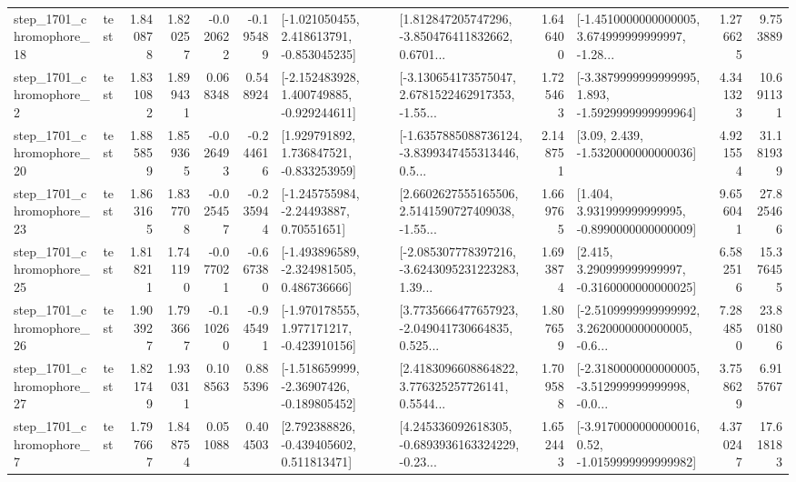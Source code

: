 \begin{tabular}{llrrrrllrlrr}
 step\_1701\_chromophore\_18 &      test &      1.840878 &    1.820257 &     -0.020622 & -0.195489 &   [-1.021050455, 2.418613791, -0.853045235] &  [1.812847205747296, -3.850476411832662, 0.6701... &       1.646400 &  [-1.4510000000000005, 3.674999999999997, -1.28... &            1.276625 &          9.753889 \\
  step\_1701\_chromophore\_2 &      test &      1.831082 &    1.899431 &      0.068348 &  0.548924 &   [-2.152483928, 1.400749885, -0.929244611] &  [-3.130654173575047, 2.6781522462917353, -1.55... &       1.725463 &  [-3.3879999999999995, 1.893, -1.5929999999999964] &            4.341323 &         10.691131 \\
 step\_1701\_chromophore\_20 &      test &      1.885859 &    1.859365 &     -0.026493 & -0.244616 &    [1.929791892, 1.736847521, -0.833253959] &  [-1.6357885088736124, -3.8399347455313446, 0.5... &       2.148751 &                 [3.09, 2.439, -1.5320000000000036] &            4.921554 &         31.181939 \\
 step\_1701\_chromophore\_23 &      test &      1.863165 &    1.837708 &     -0.025457 & -0.235944 &     [-1.245755984, -2.24493887, 0.70551651] &  [2.6602627555165506, 2.5141590727409038, -1.55... &       1.669765 &    [1.404, 3.931999999999995, -0.8990000000000009] &            9.656041 &         27.825466 \\
 step\_1701\_chromophore\_25 &      test &      1.818211 &    1.741190 &     -0.077021 & -0.667380 &   [-1.493896589, -2.324981505, 0.486736666] &  [-2.085307778397216, -3.6243095231223283, 1.39... &       1.693874 &    [2.415, 3.290999999999997, -0.3160000000000025] &            6.582516 &         15.376455 \\
 step\_1701\_chromophore\_26 &      test &      1.903927 &    1.793667 &     -0.110260 & -0.945491 &   [-1.970178555, 1.977171217, -0.423910156] &  [3.7735666477657923, -2.049041730664835, 0.525... &       1.807659 &  [-2.5109999999999992, 3.2620000000000005, -0.6... &            7.284850 &         23.801806 \\
 step\_1701\_chromophore\_27 &      test &      1.821749 &    1.930311 &      0.108563 &  0.885396 &   [-1.518659999, -2.36907426, -0.189805452] &  [2.4183096608864822, 3.776325257726141, 0.5544... &       1.709588 &  [-2.3180000000000005, -3.512999999999998, -0.0... &            3.758629 &          6.915767 \\
  step\_1701\_chromophore\_7 &      test &      1.797667 &    1.848754 &      0.051088 &  0.404503 &    [2.792388826, -0.439405602, 0.511813471] &  [4.245336092618305, -0.6893936163324229, -0.23... &       1.652443 &   [-3.9170000000000016, 0.52, -1.0159999999999982] &            4.370247 &         17.618183 \\

\end{tabular}
